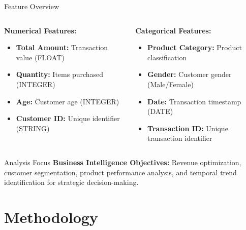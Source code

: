 \documentclass[aspectratio=169]{beamer}
\begin{document}
\begin{frame}{Feature Overview}
\begin{columns}
\begin{column}{0.5\textwidth}
\textbf{Numerical Features:}
\begin{itemize}
    \item \textbf{Total Amount:} Transaction value (FLOAT)
    \item \textbf{Quantity:} Items purchased (INTEGER)
    \item \textbf{Age:} Customer age (INTEGER)
    \item \textbf{Customer ID:} Unique identifier (STRING)
\end{itemize}
\end{column}
\begin{column}{0.5\textwidth}
\textbf{Categorical Features:}
\begin{itemize}
    \item \textbf{Product Category:} Product classification
    \item \textbf{Gender:} Customer gender (Male/Female)
    \item \textbf{Date:} Transaction timestamp (DATE)
    \item \textbf{Transaction ID:} Unique transaction identifier
\end{itemize}
\end{column}
\end{columns}

\vspace{1cm}

\begin{block}{Analysis Focus}
\textbf{Business Intelligence Objectives:} Revenue optimization, customer segmentation, product performance analysis, and temporal trend identification for strategic decision-making.
\end{block}
\end{frame}

\section{Methodology}
\end{document}
